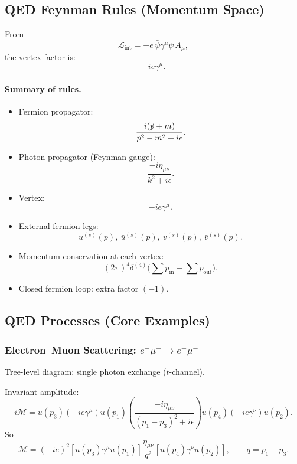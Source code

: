 \subsection{QED Feynman Rules (Momentum Space)}
From
\begin{equation}
\mathcal{L}_{\mathrm{int}}=-e\,\bar{\psi}\gamma^\mu\psi\,A_\mu,
\end{equation}
the vertex factor is:
\begin{equation}
-ie\gamma^\mu.
\end{equation}

\paragraph{Summary of rules.}
\begin{itemize}
\item Fermion propagator:
\[
\frac{i(\slashed{p}+m)}{p^2-m^2+i\epsilon}.
\]
\item Photon propagator (Feynman gauge):
\[
\frac{-i\eta_{\mu\nu}}{k^2+i\epsilon}.
\]
\item Vertex:
\[
-ie\gamma^\mu.
\]
\item External fermion legs:
\[
u^{(s)}(p),\ \bar{u}^{(s)}(p),\ v^{(s)}(p),\ \bar{v}^{(s)}(p).
\]
\item Momentum conservation at each vertex:
\[
(2\pi)^4\delta^{(4)}\Big(\sum p_{\mathrm{in}}-\sum p_{\mathrm{out}}\Big).
\]
\item Closed fermion loop: extra factor $(-1)$.
\end{itemize}

\subsection{QED Processes (Core Examples)}
\subsubsection{Electron--Muon Scattering: $e^-\mu^-\to e^-\mu^-$}
Tree-level diagram: single photon exchange ($t$-channel).

Invariant amplitude:
\begin{equation}
i\mathcal{M}
=
\bar{u}(p_3)(-ie\gamma^\mu)u(p_1)
\left(\frac{-i\eta_{\mu\nu}}{(p_1-p_3)^2+i\epsilon}\right)
\bar{u}(p_4)(-ie\gamma^\nu)u(p_2).
\end{equation}
So
\begin{equation}
\mathcal{M}
=
(-ie)^2
\left[
\bar{u}(p_3)\gamma^\mu u(p_1)
\right]
\frac{\eta_{\mu\nu}}{q^2}
\left[
\bar{u}(p_4)\gamma^\nu u(p_2)
\right],
\qquad q=p_1-p_3.
\end{equation}

